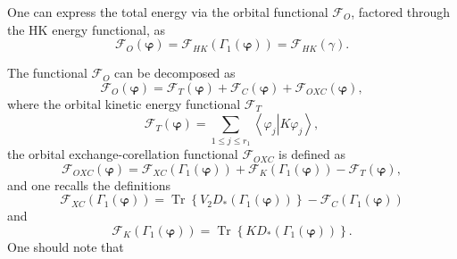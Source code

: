 \documentclass[aps,preprint]{revtex4}%
\begin{document}
One can express the total energy via the orbital functional $\mathcal{F}_{O}$,
factored through the HK energy functional, as
\begin{equation}
\mathcal{F}_{O}\left(  \boldsymbol{\varphi}\right)  =\mathcal{F}_{HK}\left(
\Gamma_{1}\left(  \boldsymbol{\varphi}\right)  \right)  =\mathcal{F}%
_{HK}\left(  \gamma\right)  . \label{FO}%
\end{equation}


The functional $\mathcal{F}_{O}$ can be decomposed as
\begin{equation}
\mathcal{F}_{O}\left(  \boldsymbol{\varphi}\right)  =\mathcal{F}_{T}\left(
\boldsymbol{\varphi}\right)  +\mathcal{F}_{C}\left(  \boldsymbol{\varphi
}\right)  +\mathcal{F}_{OXC}\left(  \boldsymbol{\varphi}\right)  , \label{KS1}%
\end{equation}
where the orbital kinetic energy functional $\mathcal{F}_{T}$
\begin{equation}
\mathcal{F}_{T}\left(  \boldsymbol{\varphi}\right)  =\sum_{1\leq j\leq r_{1}%
}\left\langle \varphi_{j}\left\vert K\varphi_{j}\right.  \right\rangle ,
\end{equation}
the orbital exchange-corellation functional $\mathcal{F}_{OXC}$ is defined as
\begin{equation}
\mathcal{F}_{OXC}\left(  \boldsymbol{\varphi}\right)  =\mathcal{F}_{XC}\left(
\Gamma_{1}\left(  \boldsymbol{\varphi}\right)  \right)  +\mathcal{F}%
_{K}\left(  \Gamma_{1}\left(  \boldsymbol{\varphi}\right)  \right)
-\mathcal{F}_{T}\left(  \boldsymbol{\varphi}\right)  , \label{KS2}%
\end{equation}
and one recalls the definitions
\begin{equation}
\mathcal{F}_{XC}\left(  \Gamma_{1}\left(  \boldsymbol{\varphi}\right)
\right)  =\operatorname{Tr}\left\{  V_{2}D_{\ast}\left(  \Gamma_{1}\left(
\boldsymbol{\varphi}\right)  \right)  \right\}  -\mathcal{F}_{C}\left(
\Gamma_{1}\left(  \boldsymbol{\varphi}\right)  \right)  \label{KS3}%
\end{equation}
and
\begin{equation}
\mathcal{F}_{K}\left(  \Gamma_{1}\left(  \boldsymbol{\varphi}\right)  \right)
=\operatorname{Tr}\left\{  KD_{\ast}\left(  \Gamma_{1}\left(
\boldsymbol{\varphi}\right)  \right)  \right\}  . \label{KS4}%
\end{equation}
One should note that
\end{document}
